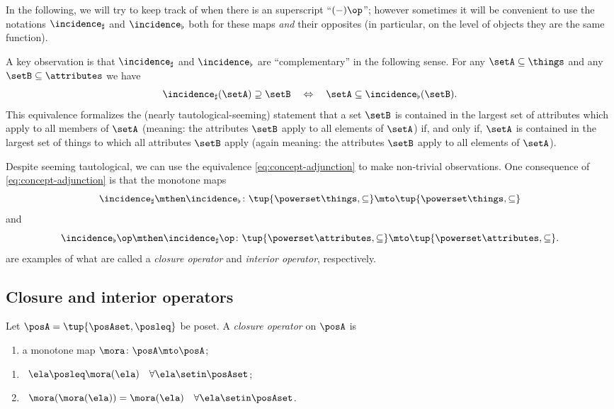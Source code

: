In the following, we will try to keep track of when there is an superscript ``$( - )\op $''; however sometimes it will be convenient to use the notations $\incidence_\sharp$ and $\incidence_\flat$ both for these maps \emph{and} their opposites (in particular, on the level of objects they are the same function). 

A key observation is that $\incidence_\sharp$ and $\incidence_\flat$ are ``complementary'' in the following sense. For any $\setA \subseteq \things$ and any $\setB \subseteq \attributes$ we have 
\begin{equation}\label{eq:concept-adjunction}
\incidence_\sharp(\setA) \supseteq \setB \quad \Leftrightarrow \quad \setA \subseteq \incidence_\flat(\setB).
\end{equation}
This equivalence formalizes the (nearly tautological-seeming) statement that a set $\setB$ is contained in the largest set of attributes which apply to all members of $\setA$ (meaning: the attributes $\setB$ apply to all elements of $\setA$) if, and only if, $\setA$ is contained in the largest set of things to which all attributes $\setB$ apply (again meaning: the attributes $\setB$ apply to all elements of $\setA$). 

Despite seeming tautological, we can use the equivalence \cref{eq:concept-adjunction} to make non-trivial observations. One consequence of \cref{eq:concept-adjunction} is that the monotone maps 
\begin{equation}\label{eq:fca-closure-operator-things}
\incidence_\sharp \mthen \incidence_\flat \colon \tup{\powerset \things, \subseteq} \mto \tup{\powerset \things, \subseteq}
\end{equation}
and 
\begin{equation}\label{eq:fca-closure-operator-attributes}
\incidence_\flat\op \mthen \incidence_\sharp\op \colon \tup{\powerset \attributes, \subseteq} \mto \tup{\powerset \attributes, \subseteq}.
\end{equation}
are examples of what are called a \emph{closure operator} and \emph{interior operator}, respectively.


\subsection{Closure and interior operators}

\begin{definition}\label{def:closure-operator}
Let $\posA = \tup{\posAset, \posleq}$ be poset. A \emph{closure operator} on $\posA$ is

\constit
\begin{enumerate}
\item a monotone map $\mora \colon \posA \mto \posA$; 
\end{enumerate}

\condit
\begin{enumerate}
\item {} \  $\ela \posleq \mora(\ela) \quad \forall \ela \setin \posAset$;
\item {} \ $\mora (\mora(\ela)) =  \mora(\ela) \quad \forall \ela \setin \posAset$. 
\end{enumerate}
\end{definition}

